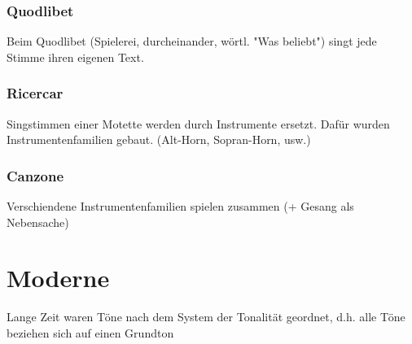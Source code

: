 \documentclass{article}
\begin{document}
\subsubsection*{Quodlibet}
Beim Quodlibet (Spielerei, durcheinander, wörtl. "Was beliebt") singt jede
Stimme ihren eigenen Text.
\subsubsection*{Ricercar}
Singstimmen einer Motette werden durch Instrumente ersetzt. Dafür wurden 
Instrumentenfamilien gebaut. (Alt-Horn, Sopran-Horn, usw.)
\subsubsection*{Canzone}
Verschiendene Instrumentenfamilien spielen zusammen (+ Gesang als Nebensache)

\section*{Moderne}
Lange Zeit waren Töne nach dem System der Tonalität geordnet, d.h. alle Töne 
beziehen sich auf einen Grundton 
\end{document}
